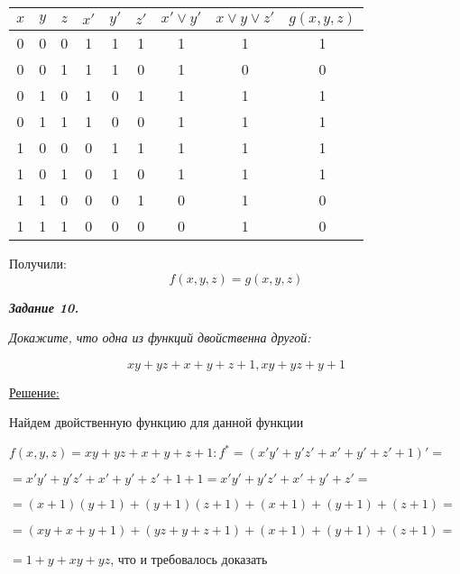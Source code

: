\documentclass[11pt]{article}
\begin{document}
\begin{center}
        \begin{tabular}{ |c|c|c|c|c|c|c|c|c| }
                \hline
                $x$ & $y$ & $z$ & $x'$ & $y'$ & $z'$ & $x' \lor y'$ & $x \lor y \lor z'$ & $g(x,y,z)$\\
                \hline
                0 & 0 & 0 & 1 & 1 & 1 & 1 & 1 & 1\\
                \hline
                0 & 0 & 1 & 1 & 1 & 0 & 1 & 0 & 0\\
                \hline
                0 & 1 & 0 & 1 & 0 & 1 & 1 & 1 & 1\\
                \hline
                0 & 1 & 1 & 1 & 0 & 0 & 1 & 1 & 1\\
                \hline
                1 & 0 & 0 & 0 & 1 & 1 & 1 & 1 & 1\\
                \hline
                1 & 0 & 1 & 0 & 1 & 0 & 1 & 1 & 1\\
                \hline
                1 & 1 & 0 & 0 & 0 & 1 & 0 & 1 & 0\\
                \hline
                1 & 1 & 1 & 0 & 0 & 0 & 0 & 1 & 0\\
                \hline
        \end{tabular}
\end{center}

Получили:\\
$$f(x,y,z)=g(x,y,z)$$

\pagebreak

\textit{\textbf{Задание 10.}}

\textit{Докажите, что одна из функций двойственна другой:}

$$ xy + yz + x + y + z + 1, xy + yz + y + 1$$

\underline{Решение:}

Найдем двойственную функцию для данной функции

$f(x,y,z)=xy + yz + x + y + z + 1: f^* = (x'y' + y'z' + x' + y' + z' + 1)' = $

$ = x'y' + y'z' + x' + y' + z' + 1 + 1 = x'y' + y'z' + x' + y' + z' = $

$ = (x+1)(y+1) + (y+1)(z+1) + (x+1) + (y+1) + (z+1) = $

$ = (xy + x + y + 1) + (yz + y + z + 1) + (x+1) + (y+1) + (z+1) = $

$ = 1 + y + xy + yz$, что и требовалось доказать
\end{document}
